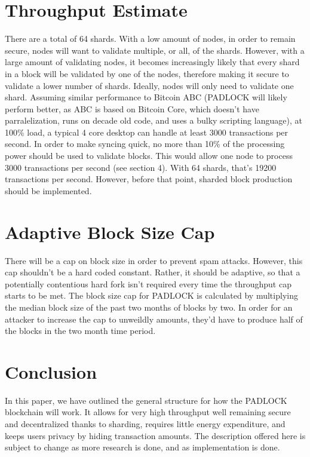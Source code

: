 \documentclass[12pt, letterpaper]{article}
\begin{document}
\section{Throughput Estimate}
There are a total of 64 shards. With a low amount of nodes, in order to remain
secure, nodes will want to validate multiple, or all, of the shards. However,
with a large amount of validating nodes, it becomes increasingly likely that
every shard in a block will be validated by one of the nodes, therefore making
it secure to validate a lower number of shards. Ideally, nodes will only need to
validate one shard. Assuming similar performance to Bitcoin ABC (PADLOCK will
likely perform better, as ABC is based on Bitcoin Core, which doesn't have
parralelization, runs on decade old code, and uses a bulky scripting language),
at 100\% load, a typical 4 core desktop can handle at least 3000 transactions
per second.  In order to make syncing quick, no more than 10\% of the processing
power should be used to validate blocks. This would allow one node to process
3000 transactions per second (see section 4). With 64 shards, that's 19200
transactions per second.  However, before that point, sharded block production
should be implemented.

\section{Adaptive Block Size Cap}
There will be a cap on block size in order to prevent spam attacks. However,
this cap shouldn't be a hard coded constant. Rather, it should be adaptive, so
that a potentially contentious hard fork isn't required every time the
throughput cap starts to be met. The block size cap for PADLOCK is calculated by
multiplying the median block size of the past two months of blocks by two. In
order for an attacker to increase the cap to unweildly amounts, they'd have to
produce half of the blocks in the two month time period.

\section{Conclusion}
In this paper, we have outlined the general structure for how the PADLOCK
blockchain will work. It allows for very high throughput well remaining secure
and decentralized thanks to sharding, requires little energy expenditure, and
keeps users privacy by hiding transaction amounts. The description offered here
is subject to change as more research is done, and as implementation is done.

\printbibliography
\end{document}
